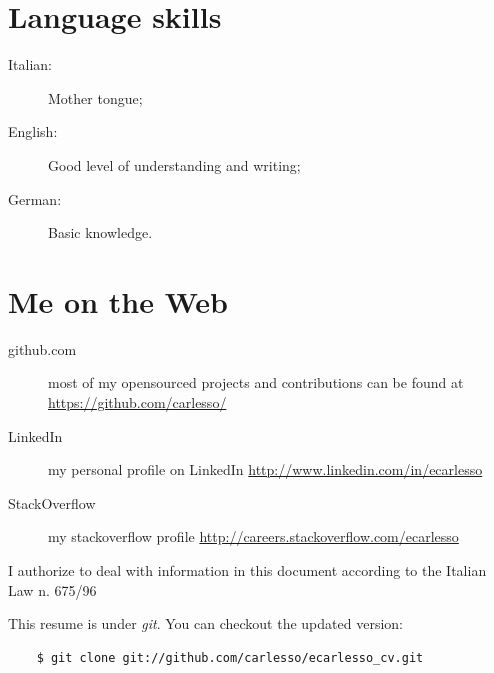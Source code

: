 \documentclass[pdftex, a4paper, 11pt]{article}
\begin{document}
\section*{Language skills}
\begin{description}
\item[Italian:] Mother tongue;
\item[English:] Good level of understanding and writing;
\item[German:] Basic knowledge.
\end{description}


\section*{Me on the Web}
\begin{description}
\item[github.com] most of my opensourced projects and contributions can be found at \url{https://github.com/carlesso/}
\item[LinkedIn] my personal profile on LinkedIn \url{http://www.linkedin.com/in/ecarlesso}
\item[StackOverflow] my stackoverflow profile \url{http://careers.stackoverflow.com/ecarlesso}
\end{description}

\vfill

I authorize to deal with information in this document according to the Italian Law n. 675/96

\vspace{1cm}

\footnotesize {This resume is under {\em git}. You can checkout the updated version:}
\begin{verbatim}
    $ git clone git://github.com/carlesso/ecarlesso_cv.git
\end{verbatim}
\end{document}
